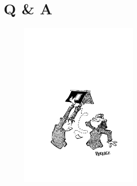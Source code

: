 \documentclass{beamer}
\begin{document}
\section*{Q \& A}
\begin{frame}
\begin{figure}
\includegraphics[width=0.5\textwidth]{qanda.pdf}
\end{figure}
\end{frame}
\end{document}
